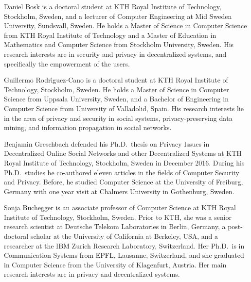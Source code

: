 Daniel Bosk is a doctoral student at KTH Royal Institute of Technology, 
Stockholm, Sweden, and a lecturer of Computer Engineering at Mid Sweden 
University, Sundsvall, Sweden.
He holds a Master of Science in Computer Science from KTH Royal Institute of 
Technology and a Master of Education in Mathematics and Computer Science from 
Stockholm University, Sweden.
His research interests are in security and privacy in decentralized systems, 
and specifically the empowerment of the users.

Guillermo Rodr\'{\i}guez-Cano is a doctoral student at KTH Royal Institute of 
Technology, Stockholm, Sweden.
He holds a Master of Science in Computer Science from Uppsala University, 
Sweden, and a Bachelor of Engineering in Computer Science from University of 
Valladolid, Spain.
His research interests lie in the area of privacy and security in social 
systems, privacy-preserving data mining, and information propagation in 
social networks.

Benjamin Greschbach defended his Ph.D.\ thesis on Privacy Issues in Decentralized 
Online Social Networks and other Decentralized Systems at KTH Royal Institute 
of Technology, Stockholm, Sweden in December 2016. During his Ph.D.\ studies he 
co-authored eleven articles in the fields of Computer Security and Privacy. 
Before, he studied Computer Science at the University of Freiburg, Germany 
with one year visit at Chalmers University in Gothenburg, Sweden.

Sonja Buchegger is an associate professor of Computer Science at KTH Royal 
Institute of Technology, Stockholm, Sweden.
Prior to KTH, she was a
senior research scientist at Deutsche Telekom Laboratories in Berlin, Germany,
a post-doctoral scholar at the University of California at Berkeley, USA, 
and a researcher at the IBM Zurich Research Laboratory, Switzerland.
Her Ph.D.\ is in Communication Systems from EPFL, Lausanne, Switzerland, and 
she graduated in Computer Science from the University of Klagenfurt, Austria.
Her main research interests are in privacy and decentralized systems.

